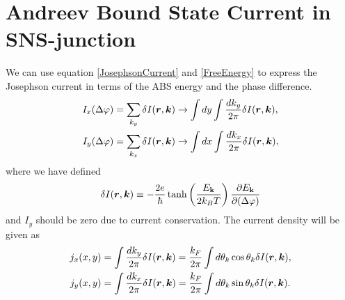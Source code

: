 \chapter{Andreev Bound State Current in SNS-junction}
We can use equation \eqref{JosephsonCurrent} and \eqref{FreeEnergy} to express the Josephson current in terms of the ABS energy and the phase difference.
\begin{equation}
\begin{split}
    I_x(\Delta \varphi) &= \sum_{k_y} \delta I(\boldsymbol{r},\boldsymbol{k}) \rightarrow \int dy \int \frac{dk_y}{2\pi} \delta I(\boldsymbol{r},\boldsymbol{k}),\\
    I_y(\Delta \varphi) &= \sum_{k_x} \delta I(\boldsymbol{r},\boldsymbol{k}) \rightarrow \int dx \int \frac{dk_x}{2\pi} \delta I(\boldsymbol{r},\boldsymbol{k}),\\
\end{split}
\label{TotalCurrent}
\end{equation}
where we have defined 
\begin{equation}
    \delta I(\boldsymbol{r},\boldsymbol{k}) \equiv -\frac{2e}{\hbar}\tanh\left(\frac{E_{\mathbf{k}}}{2k_BT}\right)\frac{\partial E_{\mathbf{k}}}{\partial (\Delta \varphi)}
    \label{Current5}
\end{equation}
and $I_y$ should be zero due to current conservation. The current density will be given as
\begin{equation}
\begin{split}
    j_x(x,y) &= \int \frac{dk_y}{2\pi} \delta I(\boldsymbol{r},\boldsymbol{k}) = \frac{k_F}{2\pi}\int d\theta_k \cos\theta_k \delta I(\boldsymbol{r},\boldsymbol{k}) ,\\
    j_y(x,y) &= \int \frac{dk_x}{2\pi} \delta I(\boldsymbol{r},\boldsymbol{k}) = \frac{k_F}{2\pi}\int d\theta_k \sin\theta_k \delta I(\boldsymbol{r},\boldsymbol{k}).\\
\end{split}
\label{CurrentDensity}
\end{equation}

